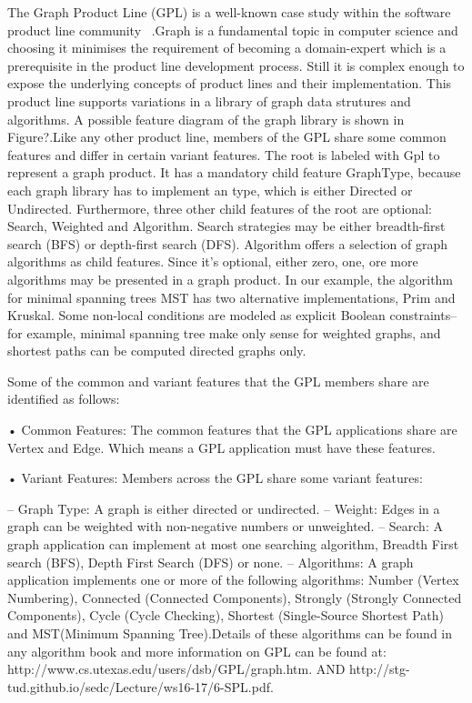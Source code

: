 

The Graph Product Line (GPL) is a well-known case study within the software product line community
~\cite{Lopez-Herrejon:2001:SPE:645418.652082}.Graph is a fundamental topic in computer science and choosing it minimises the requirement
of becoming a domain-expert which is a prerequisite in the product line development process. Still it is complex
enough to expose the underlying concepts of product lines and their implementation. This product line
 supports variations in a library of graph data strutures and algorithms. A possible feature diagram of the graph
 library is shown in Figure?.Like any other product line, members of the GPL share some common features and differ in
 certain variant features. The root is labeled with Gpl to represent a graph product. It has a mandatory child feature
 GraphType, because each graph library has to implement an type, which is either Directed or Undirected. Furthermore,
 three other child features of the root are optional: Search, Weighted and Algorithm. Search strategies may be either
  breadth-first search (BFS) or depth-first search (DFS). Algorithm offers a selection of graph algorithms as child
  features. Since it's optional, either zero, one, ore more algorithms may be presented in a graph product. In our
  example, the algorithm for minimal spanning trees MST has two alternative implementations, Prim and Kruskal. Some
  non-local conditions are modeled as explicit Boolean constraints-- for example, minimal spanning tree make only
  sense for weighted graphs, and shortest paths can be computed directed graphs only.

  Some of the common and variant features that the GPL members share are identified as
  follows:

  • Common Features: The common features that the GPL applications share are Vertex and Edge.
  Which means a GPL application must have these features.

  • Variant Features: Members across the GPL share some variant features:

  – Graph Type: A graph is either directed or undirected.
  – Weight: Edges in a graph can be weighted with non-negative numbers or unweighted.
  – Search: A graph application can implement at most one searching algorithm, Breadth First
  search (BFS), Depth First Search (DFS) or none.
  – Algorithms: A graph application implements one or more of the following algorithms: Number
  (Vertex Numbering), Connected (Connected Components), Strongly (Strongly Connected
  Components), Cycle (Cycle Checking), Shortest (Single-Source Shortest Path) and MST(Minimum
  Spanning Tree).Details of these algorithms can be found in any algorithm book and more information
  on GPL can be found at: http://www.cs.utexas.edu/users/dsb/GPL/graph.htm.
  AND http://stg-tud.github.io/sedc/Lecture/ws16-17/6-SPL.pdf. %

